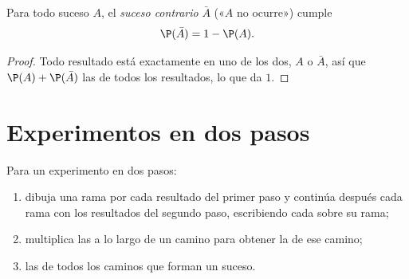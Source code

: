 \begin{proposition}\label{prop:g9:statproba:complement}
Para todo suceso $A$, el \emph{suceso contrario} $\bar A$ («$A$ no
ocurre») cumple
\[
\P(\bar A) = 1 - \P(A).
\]
\end{proposition}

\begin{proof}
Todo resultado está exactamente en uno de los dos, $A$ o $\bar A$, así que
$\P(A) + \P(\bar A)$  las  de todos los resultados, lo que da
$1$.
\end{proof}

\section{Experimentos en dos pasos}

\begin{method}\label{met:g9:statproba:tree}
Para un experimento en dos pasos:
\begin{enumerate}
  \item dibuja una rama por cada resultado del primer paso y continúa después
        cada rama con los resultados del segundo paso, escribiendo cada
         sobre su rama;
  \item multiplica las  a lo largo de un camino para obtener la 
        de ese camino;
  \item {} las  de todos los caminos que forman un suceso.
\end{enumerate}
\end{method}


